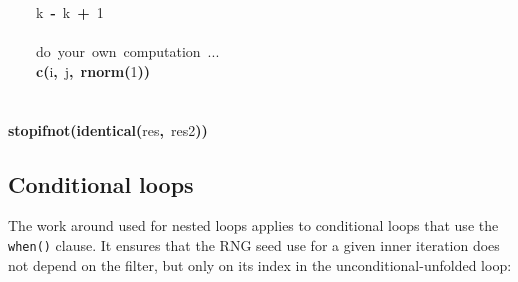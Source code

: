 \documentclass[a4paper,12pt]{article}\usepackage{graphicx, color}
\makeatletter
\newcommand{\hlnumber}[1]{\textcolor[rgb]{0,0,0}{#1}}%
\newcommand{\hlfunctioncall}[1]{\textcolor[rgb]{0.501960784313725,0,0.329411764705882}{\textbf{#1}}}%
\newcommand{\hlkeyword}[1]{\textcolor[rgb]{0,0,0}{\textbf{#1}}}%
\newcommand{\hlcomment}[1]{\textcolor[rgb]{0.180392156862745,0.6,0.341176470588235}{#1}}%
\newcommand{\hlassignement}[1]{\textcolor[rgb]{0,0,0}{\textbf{#1}}}%
\newcommand{\hlsymbol}[1]{\textcolor[rgb]{0,0,0}{#1}}%
\newcommand{\hlstd}[1]{\textcolor[rgb]{0,0,0}{#1}}%
\newenvironment{kframe}{%
 \def\FrameCommand##1{\hskip\@totalleftmargin \hskip-\fboxsep
 \colorbox{shadecolor}{##1}\hskip-\fboxsep
     \hskip-\linewidth \hskip-\@totalleftmargin \hskip\columnwidth}%
 \MakeFramed {\advance\hsize-\width
   \@totalleftmargin\z@ \linewidth\hsize
   \@setminipage}}%
 {\par\unskip\endMakeFramed}
\newenvironment{knitrout}{}{} %
\renewenvironment{knitrout}{\begin{footnotesize}}{\end{footnotesize}}
\let\code=\texttt
\makeatother
\begin{document}
\begin{knitrout}
\begin{kframe}
\begin{flushleft}
\hlstd{}{\ }{\ }{\ }{\ }\hlsymbol{k}{\ }\hlassignement{\usebox{\hlnormalsizeboxlessthan}-}{\ }\hlsymbol{k}{\ }\hlkeyword{+}{\ }\hlnumber{1}\hspace*{\fill}\\
\hlstd{}\hspace*{\fill}\\
\hlstd{}{\ }{\ }{\ }{\ }\hlcomment{\usebox{\hlnormalsizeboxhash}{\ }do{\ }your{\ }own{\ }computation{\ }...}\hspace*{\fill}\\
\hlstd{}{\ }{\ }{\ }{\ }\hlfunctioncall{c}\hlkeyword{(}\hlsymbol{i}\hlkeyword{,}{\ }\hlsymbol{j}\hlkeyword{,}{\ }\hlfunctioncall{rnorm}\hlkeyword{(}\hlnumber{1}\hlkeyword{)}\hlkeyword{)}\hspace*{\fill}\\
\hlstd{}\hlkeyword{\usebox{\hlnormalsizeboxclosebrace}}\hspace*{\fill}\\
\hlstd{}\hspace*{\fill}\\
\hlstd{}\hlfunctioncall{stopifnot}\hlkeyword{(}\hlfunctioncall{identical}\hlkeyword{(}\hlsymbol{res}\hlkeyword{,}{\ }\hlsymbol{res2}\hlkeyword{)}\hlkeyword{)}\mbox{}
\normalfont
\end{flushleft}
\end{kframe}
\end{knitrout}


\subsection{Conditional loops}
The work around used for nested loops applies to conditional loops that use the \code{when()} 
clause.
It ensures that the RNG seed use for a given inner iteration does not depend on the 
filter, but only on its index in the unconditional-unfolded loop:
\end{document}
